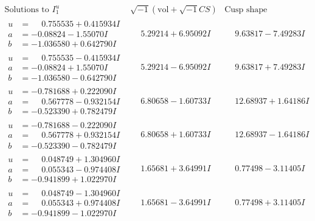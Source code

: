 \documentclass[1p]{elsarticle_modified}
\theoremstyle{definition}
\newcommand{\I}{\sqrt{-1}}
\begin{document}
$$\begin{array}{c|c|c}  
\text{Solutions to }I^u_{1}& \I (\text{vol} + \sqrt{-1}CS) & \text{Cusp shape}\\
 \hline 
\begin{aligned}
u &= \phantom{-}0.755535 + 0.415934 I \\
a &= -0.08824 - 1.55070 I \\
b &= -1.036580 + 0.642790 I\end{aligned}
 & \phantom{-}5.29214 + 6.95092 I & \phantom{-}9.63817 - 7.49283 I \\ \hline\begin{aligned}
u &= \phantom{-}0.755535 - 0.415934 I \\
a &= -0.08824 + 1.55070 I \\
b &= -1.036580 - 0.642790 I\end{aligned}
 & \phantom{-}5.29214 - 6.95092 I & \phantom{-}9.63817 + 7.49283 I \\ \hline\begin{aligned}
u &= -0.781688 + 0.222090 I \\
a &= \phantom{-}0.567778 - 0.932154 I \\
b &= -0.523390 + 0.782479 I\end{aligned}
 & \phantom{-}6.80658 - 1.60733 I & \phantom{-}12.68937 + 1.64186 I \\ \hline\begin{aligned}
u &= -0.781688 - 0.222090 I \\
a &= \phantom{-}0.567778 + 0.932154 I \\
b &= -0.523390 - 0.782479 I\end{aligned}
 & \phantom{-}6.80658 + 1.60733 I & \phantom{-}12.68937 - 1.64186 I \\ \hline\begin{aligned}
u &= \phantom{-}0.048749 + 1.304960 I \\
a &= \phantom{-}0.055343 - 0.974408 I \\
b &= -0.941899 + 1.022970 I\end{aligned}
 & \phantom{-}1.65681 + 3.64991 I & \phantom{-}0.77498 - 3.11405 I \\ \hline\begin{aligned}
u &= \phantom{-}0.048749 - 1.304960 I \\
a &= \phantom{-}0.055343 + 0.974408 I \\
b &= -0.941899 - 1.022970 I\end{aligned}
 & \phantom{-}1.65681 - 3.64991 I & \phantom{-}0.77498 + 3.11405 I \\ \hline\begin{aligned}

\end{aligned}
\end{array}$$
\end{document}
